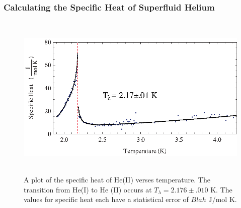 \subsubsection{Calculating the Specific Heat of Superfluid Helium}\label{calculatingthespecificheatofsuperfluidhelium}

\begin{figure}[htbp]
\begin{center}
\includegraphics[height=80mm]{./figures/lambdatrans.eps}
\caption{\small{A plot of the specific heat of He(II) verses temperature. The transition from He(I) to He (II) occurs at $T_{\lambda} = 2.176 \pm .010$ K.  The values for specific heat each have a statistical error of $Blah$ J/mol K.}}
\label{fig:lambdatrans}
\end{center}
\end{figure}

